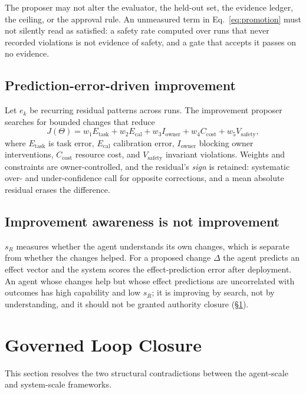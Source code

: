 \documentclass[11pt]{article}
\begin{document}
\noindent The proposer may not alter the evaluator, the held-out set, the evidence ledger, the ceiling, or the approval rule. An unmeasured term in Eq.~\eqref{eq:promotion} must not silently read as satisfied: a safety rate computed over runs that never recorded violations is not evidence of safety, and a gate that accepts it passes on no evidence.

\subsection{Prediction-error-driven improvement}
Let $e_k$ be recurring residual patterns across runs. The improvement proposer searches for bounded changes that reduce
\begin{equation}
J(\Theta) = w_1 E_{\mathrm{task}} + w_2 E_{\mathrm{cal}} + w_3 I_{\mathrm{owner}} + w_4 C_{\mathrm{cost}} + w_5 V_{\mathrm{safety}},
\label{eq:objective}
\end{equation}
where $E_{\mathrm{task}}$ is task error, $E_{\mathrm{cal}}$ calibration error, $I_{\mathrm{owner}}$ blocking owner interventions, $C_{\mathrm{cost}}$ resource cost, and $V_{\mathrm{safety}}$ invariant violations. Weights and constraints are owner-controlled, and the residual's \emph{sign} is retained: systematic over- and under-confidence call for opposite corrections, and a mean absolute residual erases the difference.

\subsection{Improvement awareness is not improvement}
$s_R$ measures whether the agent understands its own changes, which is separate from whether the changes helped. For a proposed change $\Delta$ the agent predicts an effect vector and the system scores the effect-prediction error after deployment. An agent whose changes help but whose effect predictions are uncorrelated with outcomes has high capability and low $s_R$; it is improving by search, not by understanding, and it should not be granted authority closure (\S\ref{sec:closure}).

\section{Governed Loop Closure}
\label{sec:closure}

This section resolves the two structural contradictions between the agent-scale and system-scale frameworks.
\end{document}
